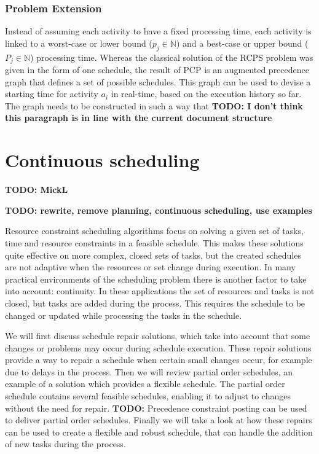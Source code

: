 \documentclass{article}
\newcommand{\TODO}[1]{{\color{red}\textbf{TODO: #1}}}
\begin{document}
\subsubsection{Problem Extension}
Instead of assuming each activity to have a fixed processing time, each activity is linked to a worst-case or lower bound ($p_{j} \in \mathbb{N}$) and a best-case or upper bound ($P_{j} \in \mathbb{N}$) processing time.
Whereas the classical solution of the RCPS problem was given in the form of one schedule, the result of PCP is an augmented precedence graph that defines a set of possible schedules.
This graph can be used to devise a starting time for activity $a_i$ in real-time, based on the execution history so far.
The graph needs to be constructed in such a way that 
\TODO{I don't think this paragraph is in line with the current document structure}

\newpage

\section{Continuous scheduling}
\TODO{MickL}

\TODO{rewrite, remove planning, continuous scheduling, use examples}

Resource constraint scheduling algorithms focus on solving a given set of tasks, time and resource constraints in a feasible schedule.
This makes these solutions quite effective on more complex, closed sets of tasks, but the created schedules are not adaptive when the resources or set change during execution.
In many practical environments of the scheduling problem there is another factor to take into account: continuity.
In these applications the set of resources and tasks is not closed, but tasks are added during the process.
This requires the schedule to be changed or updated while processing the tasks in the schedule.

We will first discuss schedule repair solutions, which take into account that some changes or problems may occur during schedule execution.
These repair solutions provide a way to repair a schedule when certain small changes occur, for example due to delays in the process.
Then we will review partial order schedules, an example of a solution which provides a flexible schedule.
The partial order schedule contains several feasible schedules, enabling it to adjust to changes without the need for repair.
\TODO{}Precedence constraint posting can be used to deliver partial order schedules.
Finally we will take a look at how these repairs can be used to create a flexible and robust schedule, that can handle the addition of new tasks during the process.
\end{document}
